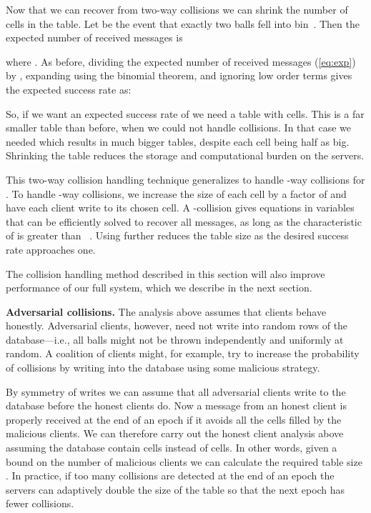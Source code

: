 \documentclass[10pt,twocolumn]{article}
\newcommand{\nicepara}[1]{\medskip\noindent\textbf{#1.}}
\begin{document}
Now that we can recover from two-way collisions we can shrink the
number of cells  in the table.  Let  be the event that 
exactly two balls fell into bin~.  Then the expected number
of received messages is

where .
As before, dividing the expected number of received messages (\ref{eq:exp}) 
by , expanding using the binomial theorem, and ignoring low order terms
gives the expected success rate as:

So, if we want an expected success rate of  
we need a table with  cells.  
This is a far smaller table than before, when we could not handle 
collisions.  In that case we needed  which results
in much bigger tables, despite each cell being half as big.
Shrinking the table reduces the storage
and computational burden on the servers.

\medskip
This two-way collision handling technique generalizes to handle
-way collisions for .
To handle -way collisions, we increase the size of each cell by a
factor of  and have each client  write  to its chosen cell.  A -collision gives 
equations in  variables that can be efficiently solved to recover
all  messages, as long as the characteristic of  is greater
than ~\cite{bos1989detection,chien1966application}.
Using  further reduces the table size as the
desired success rate approaches one.

The collision handling method described in this section will also
improve performance of our full system, which we describe in the next section.


\nicepara{Adversarial collisions} The analysis above assumes that
clients behave honestly.  Adversarial clients, however,
need not write into random rows of the database---i.e.,
all  balls might not be thrown independently and uniformly at
random.  A coalition of clients might, for example, try to increase the
probability of collisions by writing into the database using some
malicious strategy.

By symmetry of writes we can assume that all  adversarial
clients write to the database before the honest clients do.  
Now a message from an honest client is properly received at the end of an
epoch if it avoids all the cells filled by the malicious
clients.  We can therefore carry out the honest client analysis above
assuming the database contain  cells instead of  cells.
In other words, given a bound  on the number of malicious
clients we can calculate the required table size .  In practice, if
too many collisions are detected at the end of an epoch the servers can
adaptively double the size of the table so that the next epoch has
fewer collisions. 
\end{document}
